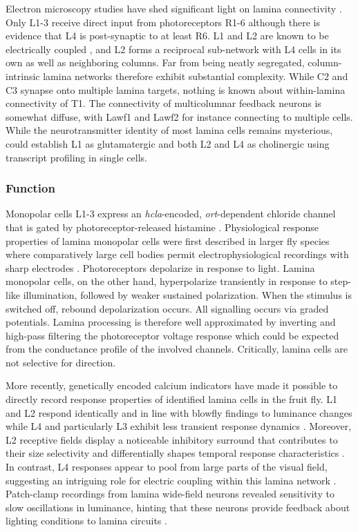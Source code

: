 Electron microscopy studies have shed significant light on lamina connectivity \citep{Meinertzhagen:1991aa,RiveraAlba:2011dd}. Only L1-3 receive direct input from photoreceptors R1-6 although there is evidence that L4 is post-synaptic to at least R6. L1 and L2 are known to be electrically coupled \citep{Joesch:2010fw}, and L2 forms a reciprocal sub-network with L4 cells in its own as well as neighboring columns. Far from being neatly segregated, column-intrinsic lamina networks therefore exhibit substantial complexity. While C2 and C3 synapse onto multiple lamina targets, nothing is known about within-lamina connectivity of T1. The connectivity of multicolumnar feedback neurons is somewhat diffuse, with Lawf1 and Lawf2 for instance connecting to multiple cells. While the neurotransmitter identity of most lamina cells remains mysterious, \citet{Takemura:2011iy} could establish L1 as glutamatergic and both L2 and L4 as cholinergic using transcript profiling in single cells.

\subsubsection{Function}
Monopolar cells L1-3 express an \textit{hcla}-encoded, \textit{ort}-dependent chloride channel that is gated by photoreceptor-released histamine \citep{Hardie:1989aa,Gengs:2002aa}. Physiological response properties of lamina monopolar cells were first described in larger fly species where comparatively large cell bodies permit electrophysiological recordings with sharp electrodes \citep{Laughlin:1978aa,Laughlin:1981wn,Laughlin:1989aa}. Photoreceptors depolarize in response to light. Lamina monopolar cells, on the other hand, hyperpolarize transiently in response to step-like illumination, followed by weaker sustained polarization. When the stimulus is switched off, rebound depolarization occurs. All signalling occurs via graded potentials. Lamina processing is therefore well approximated by inverting and high-pass filtering the photoreceptor voltage response which could be expected from the conductance profile of the involved channels. Critically, lamina cells are not selective for direction.

More recently, genetically encoded calcium indicators have made it possible to directly record response properties of identified lamina cells in the fruit fly. L1 and L2 respond identically and in line with blowfly findings to luminance changes \citep{Reiff:2010eo,Clark:2011gw} while L4 and particularly L3 exhibit less transient response dynamics \citep{Silies:2013jp,Meier:2014fr}. Moreover, L2 receptive fields display a noticeable inhibitory surround that contributes to their size selectivity and differentially shapes temporal response characteristics \citep{Freifeld:2013gu}. In contrast, L4 responses appear to pool from large parts of the visual field, suggesting an intriguing role for electric coupling within this lamina network \citep{Meier:2014fr}. Patch-clamp recordings from lamina wide-field neurons revealed sensitivity to slow oscillations in luminance, hinting that these neurons provide feedback about lighting conditions to lamina circuits \citep{Tuthill:2014gc}.

